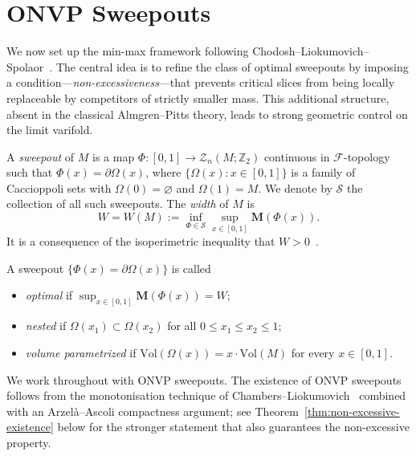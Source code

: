 
\section{ONVP Sweepouts}\label{sec:non-excessive-prelim}

We now set up the min-max framework following Chodosh--Liokumovich--Spolaor~\cite{CLS22}. The central idea is to refine the class of optimal sweepouts by imposing a condition---\emph{non-excessiveness}---that prevents critical slices from being locally replaceable by competitors of strictly smaller mass. This additional structure, absent in the classical Almgren--Pitts theory, leads to strong geometric control on the limit varifold.

\begin{definition}\label{def:p2-sweepout}
A \emph{sweepout} of $M$ is a map $\Phi \colon [0,1] \to \mathcal{Z}_n(M; \mathbb{Z}_2)$ continuous in $\mathcal{F}$-topology such that $\Phi(x) = \partial \Omega(x)$, where $\{\Omega(x) : x \in [0,1]\}$ is a family of Caccioppoli sets with $\Omega(0) = \varnothing$ and $\Omega(1) = M$. We denote by $\mathcal{S}$ the collection of all such sweepouts. The \emph{width} of $M$ is
\[
W = W(M) := \inf_{\Phi \in \mathcal{S}} \sup_{x \in [0,1]} \mathbf{M}(\Phi(x)).
\]
It is a consequence of the isoperimetric inequality that $W > 0$~\cite[Proposition~0.5]{DLT13}.
\end{definition}

\begin{definition}\label{def:p2-onvp}
A sweepout $\{\Phi(x) = \partial \Omega(x)\}$ is called
\begin{itemize}
    \item \emph{optimal} if $\sup_{x \in [0,1]} \mathbf{M}(\Phi(x)) = W$;
    \item \emph{nested} if $\Omega(x_1) \subset \Omega(x_2)$ for all $0 \leq x_1 \leq x_2 \leq 1$;
    \item \emph{volume parametrized} if $\mathrm{Vol}(\Omega(x)) = x \cdot \mathrm{Vol}(M)$ for every $x \in [0,1]$.
\end{itemize}
\end{definition}

We work throughout with ONVP sweepouts. The existence of ONVP sweepouts follows from the monotonisation technique of Chambers--Liokumovich~\cite{CL20} combined with an Arzel\`a--Ascoli compactness argument; see Theorem~\ref{thm:non-excessive-existence} below for the stronger statement that also guarantees the non-excessive property.

